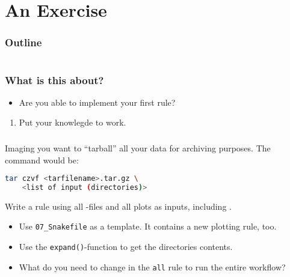\section{An Exercise}

\begin{frame}
    \frametitle{Outline}
    \begin{columns}[t]
        \begin{column}{.5\textwidth}
            \tableofcontents[sections={1-9},currentsection]
        \end{column}
        \begin{column}{.5\textwidth}
            \tableofcontents[sections={10-18},currentsection]
        \end{column}
    \end{columns}
\end{frame}

\begin{frame}
  \frametitle{What is this about?}
   \begin{question}[Questions]
   	  \begin{itemize}
         \item Are you able to implement your first rule?
      \end{itemize}
   \end{question}
   \begin{docs}[Objectives]
   	 \begin{enumerate}
        \item Put your knowlegde to work.
     \end{enumerate}
   \end{docs}
\end{frame}  

\begin{frame}[fragile]
  \frametitle{}
  Imaging you want to ``tarball'' all your data for archiving purposes. The command would be:
  \begin{lstlisting}[language=Bash, style=Shell]
tar czvf <tarfilename>.tar.gz \
    <list of input (directories)>
  \end{lstlisting}
  \pause
  \begin{task}
  	Write a rule  using all -files and all plots as inputs, including .
  \end{task}
  \begin{hint}[Hints]
  	 \begin{itemize}
       \item Use \texttt{07\_Snakefile} as a template. It contains a new plotting rule, too.
       \item Use the \texttt{expand()}-function to get the directories contents.
       \item What do you need to change in the \texttt{all} rule to run the entire workflow?
     \end{itemize}
   \end{hint}
\end{frame}
